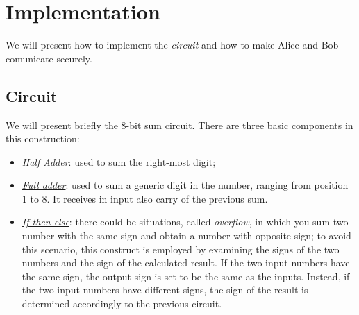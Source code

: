 \documentclass[12pt]{article}
\begin{document}
\section{Implementation}
We will present how to implement the \textit{circuit} and how to make Alice and Bob comunicate securely.
\subsection{Circuit}
We will present briefly the 8-bit sum circuit. There are three basic components in this construction:
\begin{itemize}
    \item \textit{\hyperref[half]{Half Adder}}: used to sum the right-most digit;
    \item \textit{\hyperref[full]{Full adder}}:  used to sum a generic digit in the number, ranging from position 1 to 8. It receives in input also carry of the previous sum.
    \item \textit{\hyperref[overflow]{If then else}}: there could be situations, called \textit{overflow}, in which you sum two number with the same sign and obtain a number with opposite sign; to avoid this scenario, this construct is employed by examining the signs of the two numbers and the sign of the calculated result. If the two input numbers have the same sign, the output sign is set to be the same as the inputs. Instead, if the two input numbers have different signs, the sign of the result is determined accordingly to the previous circuit.  
\end{itemize}
\end{document}
